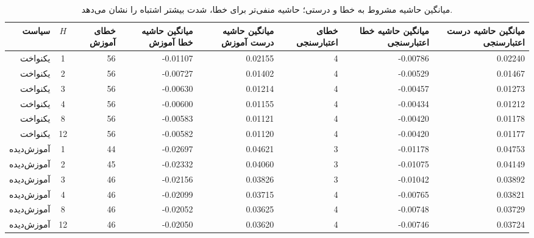 \begin{table}[htbp]
\centering\scriptsize
\caption{میانگین حاشیه مشروط به خطا و درستی؛ حاشیه منفی‌تر برای خطا، شدت بیشتر اشتباه را نشان می‌دهد.}
\label{tab:ch4-e09-conditional-margin}
\begin{tabular}{rcrrrrrr}\hline
سیاست & $H$ & خطای آموزش & میانگین حاشیه خطا آموزش & میانگین حاشیه درست آموزش & خطای اعتبارسنجی & میانگین حاشیه خطا اعتبارسنجی & میانگین حاشیه درست اعتبارسنجی\\\hline
یکنواخت & 1 & 56 & -0.01107 & 0.02155 & 4 & -0.00786 & 0.02240\\
یکنواخت & 2 & 56 & -0.00727 & 0.01402 & 4 & -0.00529 & 0.01467\\
یکنواخت & 3 & 56 & -0.00630 & 0.01214 & 4 & -0.00457 & 0.01273\\
یکنواخت & 4 & 56 & -0.00600 & 0.01155 & 4 & -0.00434 & 0.01212\\
یکنواخت & 8 & 56 & -0.00583 & 0.01121 & 4 & -0.00420 & 0.01178\\
یکنواخت & 12 & 56 & -0.00582 & 0.01120 & 4 & -0.00420 & 0.01177\\
\hline
آموزش‌دیده & 1 & 44 & -0.02697 & 0.04621 & 3 & -0.01178 & 0.04753\\
آموزش‌دیده & 2 & 45 & -0.02332 & 0.04060 & 3 & -0.01075 & 0.04149\\
آموزش‌دیده & 3 & 46 & -0.02156 & 0.03826 & 3 & -0.01042 & 0.03892\\
آموزش‌دیده & 4 & 46 & -0.02099 & 0.03715 & 4 & -0.00765 & 0.03821\\
آموزش‌دیده & 8 & 46 & -0.02052 & 0.03625 & 4 & -0.00748 & 0.03729\\
آموزش‌دیده & 12 & 46 & -0.02050 & 0.03620 & 4 & -0.00746 & 0.03724\\
\hline
\end{tabular}
\end{table}
